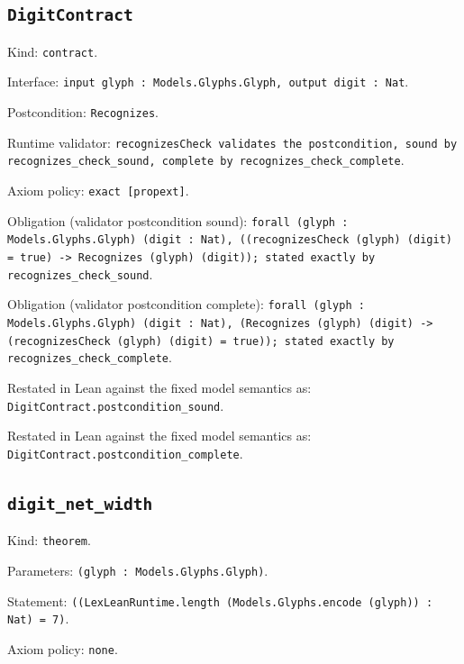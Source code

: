 \documentclass[11pt]{article}
\begin{document}
\subsection*{\texttt{DigitContract}}
\noindent Kind: \texttt{contract}.\par
\noindent Interface: \texttt{input glyph : Models.Glyphs.Glyph, output digit : Nat}.\par
\noindent Postcondition: \texttt{Recognizes}.\par
\noindent Runtime validator: \texttt{recognizesCheck validates the postcondition, sound by recognizes\_check\_sound, complete by recognizes\_check\_complete}.\par
\noindent Axiom policy: \texttt{exact [propext]}.\par
\noindent Obligation (validator postcondition sound): \texttt{forall (glyph : Models.Glyphs.Glyph) (digit : Nat), ((recognizesCheck (glyph) (digit) = true) -> Recognizes (glyph) (digit)); stated exactly by recognizes\_check\_sound}.\par
\noindent Obligation (validator postcondition complete): \texttt{forall (glyph : Models.Glyphs.Glyph) (digit : Nat), (Recognizes (glyph) (digit) -> (recognizesCheck (glyph) (digit) = true)); stated exactly by recognizes\_check\_complete}.\par
\noindent Restated in Lean against the fixed model semantics as: \texttt{DigitContract.postcondition\_sound}.\par
\noindent Restated in Lean against the fixed model semantics as: \texttt{DigitContract.postcondition\_complete}.\par
\subsection*{\texttt{digit\_net\_width}}
\noindent Kind: \texttt{theorem}.\par
\noindent Parameters: \texttt{(glyph : Models.Glyphs.Glyph)}.\par
\noindent Statement: \texttt{((LexLeanRuntime.length (Models.Glyphs.encode (glyph)) : Nat) = 7)}.\par
\noindent Axiom policy: \texttt{none}.\par
\end{document}
